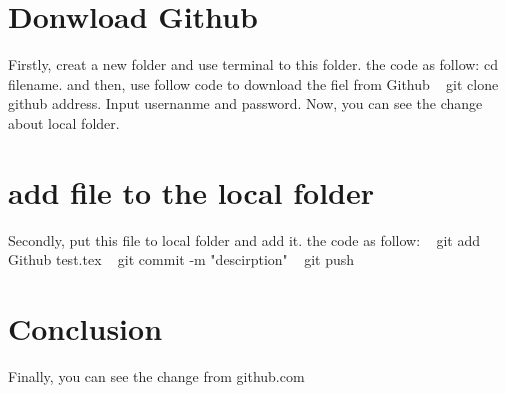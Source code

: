 \documentclass[11pt, a4paper]{article}
\begin{document}
\section{Donwload Github}
Firstly, creat a new folder and use terminal to this folder. the code as follow:
cd {filename}.
and then, use follow code to download the fiel from Github
~ git clone {github address}.
Input usernanme and password.
Now, you can see the change about local folder.
\section{add file to the local folder}
Secondly, put this file to local folder and add it.
the code as follow:
~ git add Github test.tex
~ git commit -m "descirption"
~ git push
\section{Conclusion}
Finally, you can see the change from github.com
\end{document}
